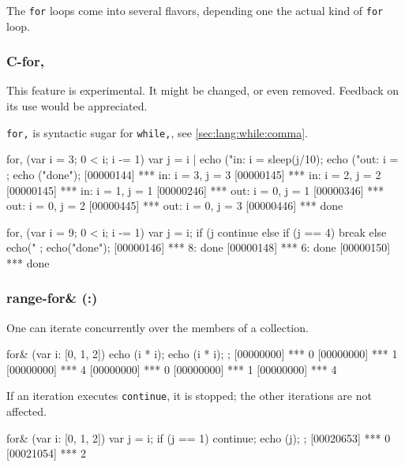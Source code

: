 The \lstinline|for| loops come into several flavors, depending one the
actual kind of \lstinline|for| loop.

\subsubsection{C-for,}
\begin{note}
  This feature is experimental.  It might be changed, or even removed.
  Feedback on its use would be appreciated.
\end{note}

\lstinline|for,| is syntactic sugar for \lstinline|while,|, see
\autoref{sec:lang:while:comma}.

\begin{urbiscript}
for, (var i = 3; 0 < i; i -= 1)
{
  var j = i |
  echo ("in: i = %
  sleep(j/10);
  echo ("out: i = %
};
echo ("done");
[00000144] *** in: i = 3, j = 3
[00000145] *** in: i = 2, j = 2
[00000145] *** in: i = 1, j = 1
[00000246] *** out: i = 0, j = 1
[00000346] *** out: i = 0, j = 2
[00000445] *** out: i = 0, j = 3
[00000446] *** done
\end{urbiscript}

\begin{urbiscript}
for, (var i = 9; 0 < i; i -= 1)
{
  var j = i;
  if (j %
    continue
  else if (j == 4)
    break
  else
    echo("%
};
echo("done");
[00000146] *** 8: done
[00000148] *** 6: done
[00000150] *** done
\end{urbiscript}


\subsubsection{range-for\& (:)}
\label{sec:lang:for:each:and}

One can iterate concurrently over the members of a collection.

\begin{urbiscript}
for& (var i: [0, 1, 2])
{
  echo (i * i);
  echo (i * i);
};
[00000000] *** 0
[00000000] *** 1
[00000000] *** 4
[00000000] *** 0
[00000000] *** 1
[00000000] *** 4
\end{urbiscript}

If an iteration executes \lstinline|continue|, it is stopped; the
other iterations are not affected.

\begin{urbiscript}
for& (var i: [0, 1, 2])
{
  var j = i;
  if (j == 1)
    continue;
  echo (j);
};
[00020653] *** 0
[00021054] *** 2
\end{urbiscript}

